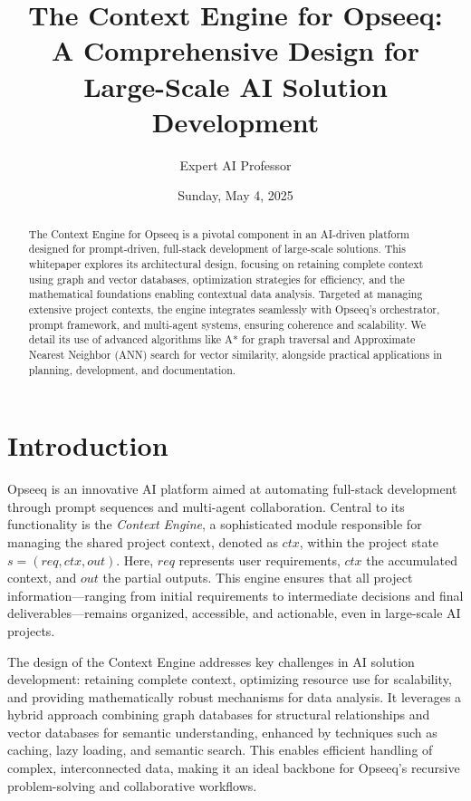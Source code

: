 \documentclass[11pt]{article}
\title{The Context Engine for Opseeq:\\A Comprehensive Design for Large-Scale AI Solution Development}
\author{Expert AI Professor}
\date{Sunday, May 4, 2025}
\begin{document}
\maketitle

\begin{abstract}
The Context Engine for Opseeq is a pivotal component in an AI-driven platform designed for prompt-driven, full-stack development of large-scale solutions. This whitepaper explores its architectural design, focusing on retaining complete context using graph and vector databases, optimization strategies for efficiency, and the mathematical foundations enabling contextual data analysis. Targeted at managing extensive project contexts, the engine integrates seamlessly with Opseeq’s orchestrator, prompt framework, and multi-agent systems, ensuring coherence and scalability. We detail its use of advanced algorithms like A* for graph traversal and Approximate Nearest Neighbor (ANN) search for vector similarity, alongside practical applications in planning, development, and documentation.
\end{abstract}

\section{Introduction}
\label{sec:introduction}

Opseeq is an innovative AI platform aimed at automating full-stack development through prompt sequences and multi-agent collaboration. Central to its functionality is the \emph{Context Engine}, a sophisticated module responsible for managing the shared project context, denoted as \( ctx \), within the project state \( s = (req, ctx, out) \). Here, \( req \) represents user requirements, \( ctx \) the accumulated context, and \( out \) the partial outputs. This engine ensures that all project information—ranging from initial requirements to intermediate decisions and final deliverables—remains organized, accessible, and actionable, even in large-scale AI projects.

The design of the Context Engine addresses key challenges in AI solution development: retaining complete context, optimizing resource use for scalability, and providing mathematically robust mechanisms for data analysis. It leverages a hybrid approach combining graph databases for structural relationships and vector databases for semantic understanding, enhanced by techniques such as caching, lazy loading, and semantic search. This enables efficient handling of complex, interconnected data, making it an ideal backbone for Opseeq’s recursive problem-solving and collaborative workflows.
\end{document}
